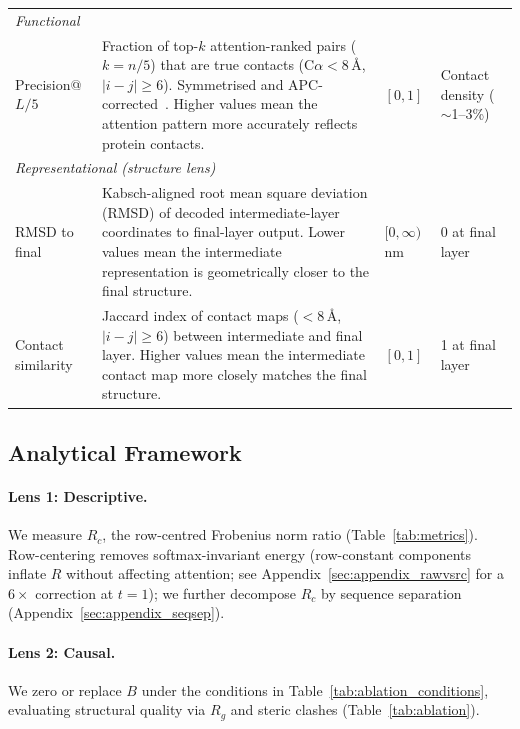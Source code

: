 \documentclass{article}
\begin{document}
\begin{table}[h]
\begin{tabular}{p{2.5cm}p{7.2cm}p{1.6cm}p{2.2cm}}
        \midrule
        \multicolumn{4}{l}{\emph{Functional}} \\[2pt]
        Precision@$L/5$ & Fraction of top-$k$ attention-ranked pairs ($k{=}n/5$) that are true contacts (C$\alpha < 8$\,\AA, $|i{-}j| \geq 6$). Symmetrised and APC-corrected~\citep{rao2020transformer}. Higher values mean the attention pattern more accurately reflects protein contacts. & $[0, 1]$ & Contact density ($\sim$1--3\%) \\[4pt]
        \midrule
        \multicolumn{4}{l}{\emph{Representational (structure lens)}} \\[2pt]
        RMSD to final & Kabsch-aligned root mean square deviation (RMSD) of decoded intermediate-layer coordinates to final-layer output. Lower values mean the intermediate representation is geometrically closer to the final structure. & $[0, \infty)$ nm & 0 at final layer \\[4pt]
        Contact similarity & Jaccard index of contact maps ($< 8$\,\AA, $|i{-}j| \geq 6$) between intermediate and final layer. Higher values mean the intermediate contact map more closely matches the final structure. & $[0, 1]$ & 1 at final layer \\
        \bottomrule
    \end{tabular}
\end{table}

\subsection{Analytical Framework}

\paragraph{Lens 1: Descriptive.}
We measure $R_c$, the row-centred Frobenius norm ratio (Table~\ref{tab:metrics}).
Row-centering removes softmax-invariant energy (row-constant components inflate $R$ without affecting attention; see Appendix~\ref{sec:appendix_rawvsrc} for a $6\times$ correction at $t{=}1$); we further decompose $R_c$ by sequence separation (Appendix~\ref{sec:appendix_seqsep}).

\paragraph{Lens 2: Causal.}
We zero or replace $B$ under the conditions in Table~\ref{tab:ablation_conditions}, evaluating structural quality via $R_g$ and steric clashes (Table~\ref{tab:ablation}).
\end{document}
